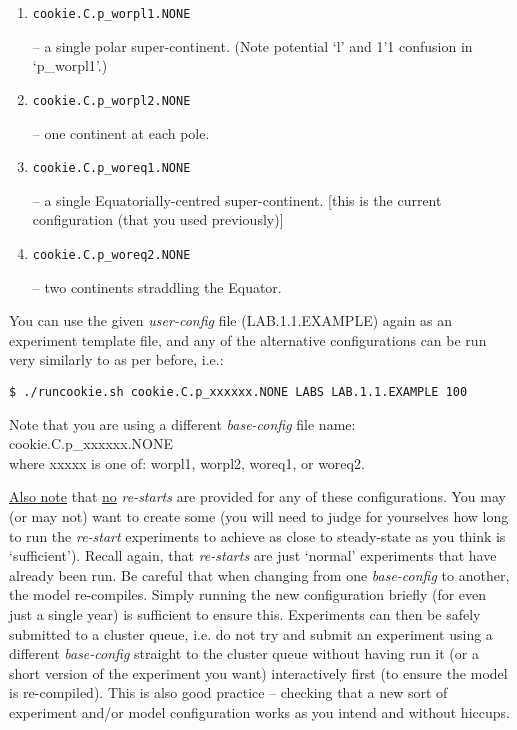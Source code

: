 \vspace{1mm}
\begin{enumerate}[noitemsep]
\setlength{\itemindent}{.2in}
\item
\begin{verbatim}
cookie.C.p_worpl1.NONE
\end{verbatim}
 – a single polar super-continent. (Note potential ‘l’ and 1’1 confusion in ‘\textsf{\footnotesize p\_worpl1}’.)
\item
\begin{verbatim}
cookie.C.p_worpl2.NONE
\end{verbatim}
  – one continent at each pole.
\item
\begin{verbatim}
cookie.C.p_woreq1.NONE
\end{verbatim}
  – a single Equatorially-centred super-continent. [this is the current configuration (that you  used previously)]
\item
\begin{verbatim}
cookie.C.p_woreq2.NONE
\end{verbatim}
 – two continents straddling the Equator.
\end{enumerate}
\vspace{1mm}

You can use the given \textit{user-config} file (\textsf{\footnotesize LAB.1.1.EXAMPLE}) again as an experiment template file, and any of the alternative configurations can be run very similarly to as per before, i.e.:

\vspace{-2mm}\begin{verbatim}
$ ./runcookie.sh cookie.C.p_xxxxxx.NONE LABS LAB.1.1.EXAMPLE 100
\end{verbatim}\vspace{-2mm}
Note that you are using a different \textit{base-config} file name: \textsf{\footnotesize cookie.C.p\_xxxxxx.NONE}
\\where \textsf{\footnotesize xxxxx} is one of: \textsf{\footnotesize worpl1}, \textsf{\footnotesize worpl2}, \textsf{\footnotesize woreq1}, or \textsf{\footnotesize woreq2}.

\uline{Also note} that \uline{no} \textit{re-starts} are provided for any of these configurations. You may (or may not) want to create some (you will need to judge for yourselves how long to run the \textit{re-start} experiments to achieve as close to steady-state as you think is ‘sufficient’). Recall again, that \textit{re-starts} are just ‘normal’ experiments that have already been run.
Be careful that when changing from one \textit{base-config} to another, the model re-compiles. Simply running the new configuration briefly (for even just a single year) is sufficient to ensure this. Experiments can then be safely submitted to a cluster queue, i.e. do not try and submit an experiment using a different \textit{base-config} straight to the cluster queue without having run it (or a short version of the experiment you want) interactively first (to ensure the model is re-compiled). This is also good practice – checking that a new sort of experiment and/or model configuration works as you intend and without hiccups.

